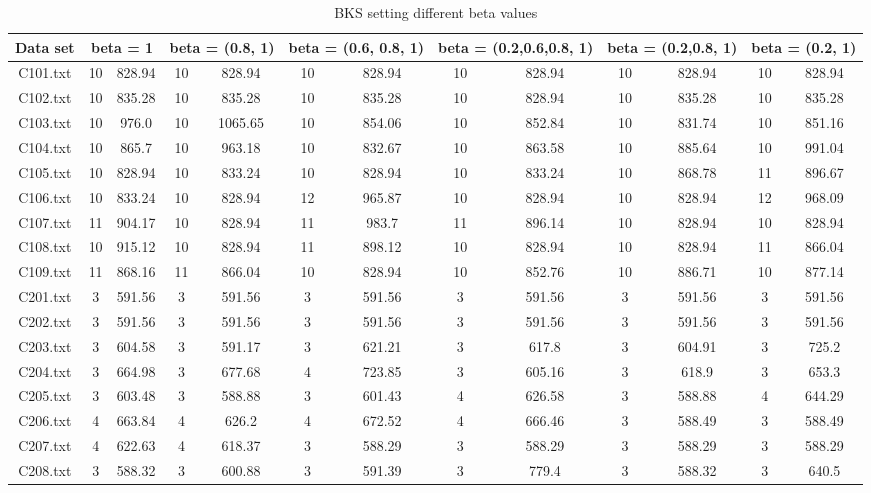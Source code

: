 \begin{table}[H]
\begin{tabular}{c | c c | c c | c c | c c | c c | c c}

\hline
Data set & \multicolumn{2}{c}{ beta = 1} & \multicolumn{2}{c}{ beta = (0.8, 1)}& \multicolumn{2}{c}{ beta = (0.6, 0.8, 1)} & \multicolumn{2}{c}{ beta = (0.2,0.6,0.8, 1)} & \multicolumn{2}{c}{ beta = (0.2,0.8, 1)} & \multicolumn{2}{c}{ beta = (0.2, 1)}\\
\hline
C101.txt &  10 & 828.94 &  10 & 828.94 &  10 & 828.94 &  10 & 828.94 &  10 & 828.94 &  10 & 828.94  \\
C102.txt &  10 & 835.28 &  10 & 835.28 &  10 & 835.28 &  10 & 828.94 &  10 & 835.28 &  10 & 835.28  \\
C103.txt &  10 & 976.0 &  10 & 1065.65 &  10 & 854.06 &  10 & 852.84 &  10 & 831.74 &  10 & 851.16   \\
C104.txt &  10 & 865.7 &  10 & 963.18 &  10 & 832.67 &  10 & 863.58 &  10 & 885.64 &  10 & 991.04  \\
C105.txt &  10 & 828.94 &  10 & 833.24 &  10 & 828.94 &  10 & 833.24 &  10 & 868.78 &  11 & 896.67  \\
C106.txt &  10 & 833.24 &  10 & 828.94 &  12 & 965.87 &  10 & 828.94 &  10 & 828.94 &  12 & 968.09  \\
C107.txt &  11 & 904.17 &  10 & 828.94 &  11 & 983.7 &  11 & 896.14 &  10 & 828.94 &  10 & 828.94  \\
C108.txt &  10 & 915.12 &  10 & 828.94 &  11 & 898.12 &  10 & 828.94 &  10 & 828.94 &  11 & 866.04  \\
C109.txt &  11 & 868.16 &  11 & 866.04 &  10 & 828.94 &  10 & 852.76 &  10 & 886.71 &  10 & 877.14   \\
C201.txt &  3 & 591.56 &  3 & 591.56 &  3 & 591.56 &  3 & 591.56 &  3 & 591.56 &  3 & 591.56   \\
C202.txt &  3 & 591.56 &  3 & 591.56 &  3 & 591.56 &  3 & 591.56 &  3 & 591.56 &  3 & 591.56   \\
C203.txt &  3 & 604.58 &  3 & 591.17 &  3 & 621.21 &  3 & 617.8 &  3 & 604.91 &  3 & 725.2   \\
C204.txt &  3 & 664.98 &  3 & 677.68 &  4 & 723.85 &  3 & 605.16 &  3 & 618.9 &  3 & 653.3   \\
C205.txt &  3 & 603.48 &  3 & 588.88 &  3 & 601.43 &  4 & 626.58 &  3 & 588.88 &  4 & 644.29   \\
C206.txt &  4 & 663.84 &  4 & 626.2 &  4 & 672.52 &  4 & 666.46 &  3 & 588.49 &  3 & 588.49   \\
C207.txt &  4 & 622.63 &  4 & 618.37 &  3 & 588.29 &  3 & 588.29 &  3 & 588.29 &  3 & 588.29   \\
C208.txt &  3 & 588.32 &  3 & 600.88 &  3 & 591.39 &  3 & 779.4 &  3 & 588.32 &  3 & 640.5   \\
\hline

\end{tabular} \
\caption{BKS setting different beta values}
\label{solomon_beta_values}
\end{table}\
